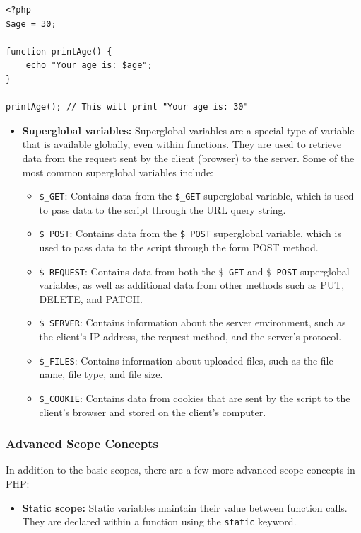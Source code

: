 \documentclass[11pt]{article}
\begin{document}
\begin{verbatim}
<?php
$age = 30;

function printAge() {
    echo "Your age is: $age";
}

printAge(); // This will print "Your age is: 30"
\end{verbatim}

\begin{itemize}
\item \textbf{Superglobal variables:} Superglobal variables are a special type of
variable that is available globally, even within functions. They are
used to retrieve data from the request sent by the client (browser) to
the server. Some of the most common superglobal variables include:

\begin{itemize}
\item \texttt{\$\_GET}: Contains data from the \texttt{\$\_GET} superglobal variable, which
is used to pass data to the script through the URL query string.
\item \texttt{\$\_POST}: Contains data from the \texttt{\$\_POST} superglobal variable,
which is used to pass data to the script through the form POST
method.
\item \texttt{\$\_REQUEST}: Contains data from both the \texttt{\$\_GET} and \texttt{\$\_POST}
superglobal variables, as well as additional data from other methods
such as PUT, DELETE, and PATCH.
\item \texttt{\$\_SERVER}: Contains information about the server environment, such
as the client's IP address, the request method, and the server's
protocol.
\item \texttt{\$\_FILES}: Contains information about uploaded files, such as the
file name, file type, and file size.
\item \texttt{\$\_COOKIE}: Contains data from cookies that are sent by the script
to the client's browser and stored on the client's computer.
\end{itemize}
\end{itemize}

\subsubsection{Advanced Scope Concepts}
\label{sec:orgb31221e}
In addition to the basic scopes, there are a few more advanced scope
concepts in PHP:

\begin{itemize}
\item \textbf{Static scope:} Static variables maintain their value between function
calls. They are declared within a function using the \texttt{static} keyword.
\end{itemize}
\end{document}
